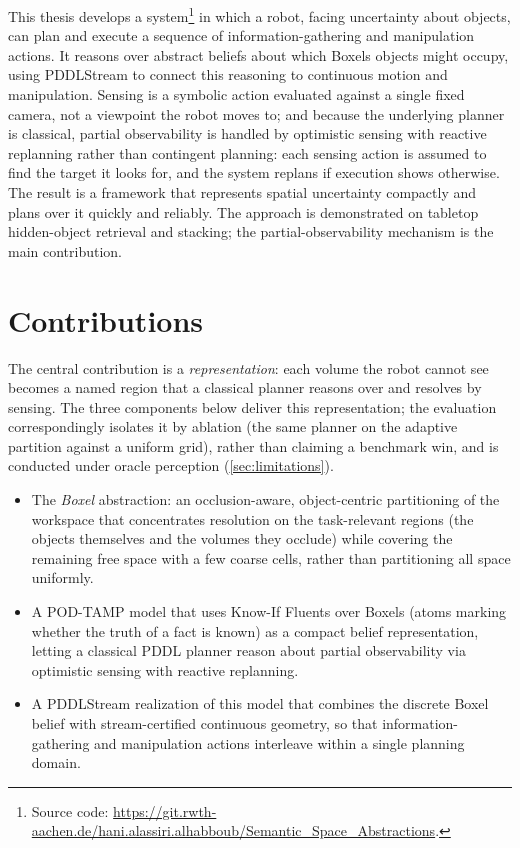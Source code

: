 This thesis develops a system\footnote{Source code: \url{https://git.rwth-aachen.de/hani.alassiri.alhabboub/Semantic_Space_Abstractions}.} in which a robot, facing uncertainty about objects, can plan and execute a sequence of information-gathering and manipulation actions. It reasons over abstract beliefs about which Boxels objects might occupy, using PDDLStream to connect this reasoning to continuous motion and manipulation. Sensing is a symbolic action evaluated against a single fixed camera, not a viewpoint the robot moves to; and because the underlying planner is classical, partial observability is handled by optimistic sensing with reactive replanning rather than contingent planning: each sensing action is assumed to find the target it looks for, and the system replans if execution shows otherwise. The result is a framework that represents spatial uncertainty compactly and plans over it quickly and reliably. The approach is demonstrated on tabletop hidden-object retrieval and stacking; the partial-observability mechanism is the main contribution.

\section{Contributions}
The central contribution is a \emph{representation}: each volume the robot cannot see becomes a named region that a classical planner reasons over and resolves by sensing. The three components below deliver this representation; the evaluation correspondingly isolates it by ablation (the same planner on the adaptive partition against a uniform grid), rather than claiming a benchmark win, and is conducted under oracle perception (\cref{sec:limitations}).
\begin{itemize}
    \item The \emph{Boxel} abstraction: an occlusion-aware, object-centric partitioning of the workspace that concentrates resolution on the task-relevant regions (the objects themselves and the volumes they occlude) while covering the remaining free space with a few coarse cells, rather than partitioning all space uniformly.
    \item A POD-TAMP model that uses Know-If Fluents over Boxels (atoms marking whether the truth of a fact is known) as a compact belief representation, letting a classical PDDL planner reason about partial observability via optimistic sensing with reactive replanning.
    \item A PDDLStream realization of this model that combines the discrete Boxel belief with stream-certified continuous geometry, so that information-gathering and manipulation actions interleave within a single planning domain.
\end{itemize}

